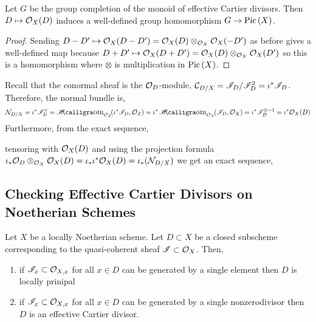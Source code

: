 \documentclass[12pt]{article}
\begin{document}
\begin{cor}
Let $G$ be the group completion of the monoid of effective Cartier divisors. Then $D \mapsto \mathcal{O}_{X}(D)$ induces a well-defined group homomorphism $G \to \mathrm{Pic} \left( X \right)$.
\end{cor}

\begin{proof}
Sending $D - D' \mapsto \mathcal{O}_{X}(D - D') = \mathcal{O}_{X}(D) \otimes_{\mathcal{O}_{X}} \mathcal{O}_{X}(-D')$ as before gives a well-defined map because $D + D' \mapsto \mathcal{O}_{X}(D + D') = \mathcal{O}_{X}(D) \otimes_{\mathcal{O}_{X}} \mathcal{O}_{X}(D')$ so this is a homomorphism where $\otimes$ is multiplication in $\mathrm{Pic} \left( X \right)$.
\end{proof}

\begin{rmk}
Recall that the conormal sheaf is the $\mathcal{O}_{D}$-module, $\mathcal{C}_{D/X} = \mathscr{I}_D / \mathscr{I}_D^2 = \iota^* \mathscr{I}_D$. Therefore, the normal bundle is,
\[ \sN_{D/X} = \iota^* \I_D^{\vee} = \shHom{\struct{Z}}{\iota^* \I_D}{\struct{Z}} = \iota^* \shHom{\struct{X}}{\I_D}{\struct{X}} = \iota^* \I_D^{\otimes -1} = \iota^* \struct{X}(D) \]
Furthermore, from the exact sequence,
\begin{center}
\end{center}
tensoring with $\mathcal{O}_{X}(D)$ and using the projection formula $\iota_* \mathcal{O}_{D} \otimes_{\mathcal{O}_{X}} \mathcal{O}_{X}(D) = \iota_* \iota^* \mathcal{O}_{X}(D) = \iota_* (\mathcal{N}_{D/X})$ we get an exact sequence,
\begin{center}
\end{center}
\end{rmk}

\subsection{Checking Effective Cartier Divisors on Noetherian Schemes}

\begin{lemma}
Let $X$ be a locally Noetherian scheme. Let $D \subset X$ be a closed subscheme corresponding to the quasi-coherent sheaf $\mathscr{I} \subset \mathcal{O}_{X}$. Then,
\begin{enumerate}
\item if $\mathscr{I}_x \subset \mathcal{O}_{X, x}$ for all $x \in D$ can be generated by a single element then $D$ is locally prinipal
\item if $\mathscr{I}_x \subset \mathcal{O}_{X, x}$ for all $x \in D$ can be generated by a single nonzerodivisor then $D$ is an effective Cartier divisor.
\end{enumerate}
\end{lemma}
\end{document}
